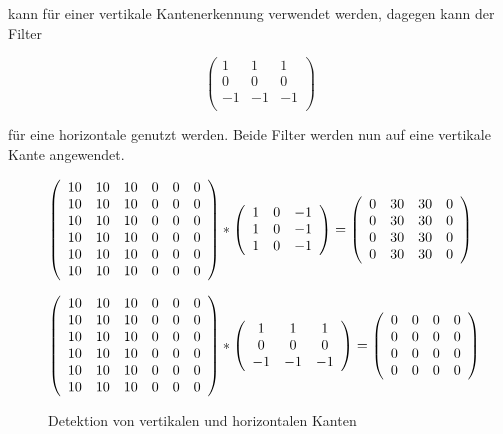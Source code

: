 kann für einer vertikale Kantenerkennung verwendet werden, dagegen kann der Filter 


$$\left(
\begin{array}{ccc}
    1 &  1 &  1 \\
    0 &  0 &  0 \\
    -1 & -1 & -1 \\
\end{array}
\right)
$$

für eine horizontale genutzt werden. Beide Filter werden nun auf eine vertikale Kante angewendet.


\begin{figure}
$$
\left(
\begin{array}{ccc ccc}
    10 & 10 & 10 & 0 & 0 & 0 \\
    10 & 10 & 10 & 0 & 0 & 0 \\
    10 & 10 & 10 & 0 & 0 & 0 \\
    10 & 10 & 10 & 0 & 0 & 0 \\
    10 & 10 & 10 & 0 & 0 & 0 \\
    10 & 10 & 10 & 0 & 0 & 0 \\
\end{array}
\right)
\ast
\left(
\begin{array}{ccc}
    1 & 0 & -1 \\
    1 & 0 & -1 \\
    1 & 0 & -1 \\
\end{array}
\right)
=
\left(
\begin{array}{cccc}
    0 & 30 & 30 & 0 \\
    0 & 30 & 30 & 0 \\
    0 & 30 & 30 & 0 \\
    0 & 30 & 30 & 0 \\
\end{array}
\right)
$$

$$
\left(
\begin{array}{ccc ccc}
    10 & 10 & 10 & 0 & 0 & 0 \\
    10 & 10 & 10 & 0 & 0 & 0 \\
    10 & 10 & 10 & 0 & 0 & 0 \\
    10 & 10 & 10 & 0 & 0 & 0 \\
    10 & 10 & 10 & 0 & 0 & 0 \\
    10 & 10 & 10 & 0 & 0 & 0 \\
\end{array}
\right)
\ast
\left(
\begin{array}{ccc}
    1 &  1 &  1 \\
    0 &  0 &  0 \\
    -1 & -1 & -1 \\
\end{array}
\right)
=
\left(
\begin{array}{cccc}
    0 & 0 & 0 & 0 \\
    0 & 0 & 0 & 0 \\
    0 & 0 & 0 & 0 \\
    0 & 0 & 0 & 0 \\
\end{array}
\right)
$$
  \caption{Detektion von vertikalen und horizontalen Kanten}
\end{figure}

